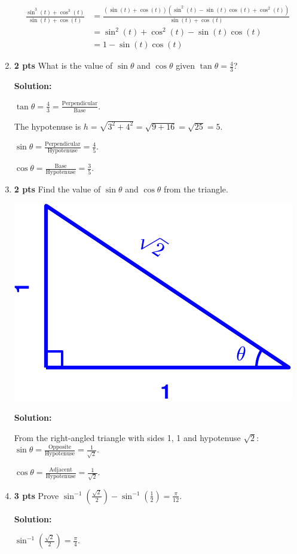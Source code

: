 \documentclass[nohyper,nobib,xcolor=dvipsnames,svgnames,x11names]{tufte-book}
\newenvironment{multiequation}{%
  \setlength{\abovedisplayskip}{3pt}      %
  \setlength{\belowdisplayskip}{6pt}      %
  \setlength{\abovedisplayshortskip}{3pt} %
  \setlength{\belowdisplayshortskip}{6pt} %
  \begin{equation}%
    \begin{aligned}%
}{%
    \end{aligned}%
  \end{equation}%
}
\begin{document}
\begin{enumerate}
    \begin{multiequation}
        \frac{\sin^3(t)+\cos^3(t)}{\sin(t)+\cos(t)} &= \frac{(\sin(t)+\cos(t))(\sin^2(t)-\sin(t)\cos(t)+\cos^2(t))}{\sin(t)+\cos(t)} \\
        &= \sin^2(t)+\cos^2(t)-\sin(t)\cos(t) \\
        &= 1-\sin(t)\cos(t)
    \end{multiequation}

    \item \textbf{2 pts} What is the value of $\sin\theta$ and $\cos\theta$ given $\tan\theta=\frac{4}{3}$?
    
    \textbf{Solution:}
    
    $\tan\theta = \frac{4}{3} = \frac{\text{Perpendicular}}{\text{Base}}$.
    
    The hypotenuse is $h = \sqrt{3^2+4^2} = \sqrt{9+16} = \sqrt{25} = 5$.
    
    $\sin\theta = \frac{\text{Perpendicular}}{\text{Hypotenuse}} = \frac{4}{5}$.
    
    $\cos\theta = \frac{\text{Base}}{\text{Hypotenuse}} = \frac{3}{5}$.

    \item \textbf{2 pts} Find the value of $\sin\theta$ and $\cos\theta$ from the triangle.

    \includegraphics[width=0.4\linewidth]{../Code/figures/Ch01_triangle_drawing.pdf}
    
\textbf{Solution:}

    From the right-angled triangle with sides 1, 1 and hypotenuse $\sqrt{2}$:
    $\sin\theta = \frac{\text{Opposite}}{\text{Hypotenuse}} = \frac{1}{\sqrt{2}}$.
    
    $\cos\theta = \frac{\text{Adjacent}}{\text{Hypotenuse}} = \frac{1}{\sqrt{2}}$.

    \item \textbf{3 pts} Prove $\sin^{-1}(\frac{\sqrt{2}}{2})-\sin^{-1}(\frac{1}{2})=\frac{\pi}{12}$.

\textbf{Solution:}    
    
    $\sin^{-1}(\frac{\sqrt{2}}{2}) = \frac{\pi}{4}$.
    

\end{enumerate}
\end{document}
